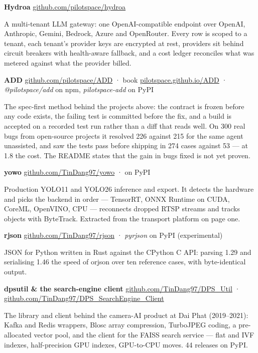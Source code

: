 \documentclass[10pt,a4paper,ragged2e,withhyper]{altacv}
\newcommand{\work}[3]{\par\vspace{7pt}\noindent\textbf{\textcolor{accent}{#1}} \textcolor{accent}{\textbullet} {\footnotesize #2}\par\nobreak\vspace{1pt}\noindent #3\par}
\begin{document}
\work{Hydroa}{\href{https://github.com/pilotspace/hydroa}{github.com/pilotspace/hydroa}}{A multi-tenant LLM gateway: one OpenAI-compatible endpoint over OpenAI, Anthropic, Gemini, Bedrock, Azure and OpenRouter. Every row is scoped to a tenant, each tenant's provider keys are encrypted at rest, providers sit behind circuit breakers with health-aware fallback, and a cost ledger reconciles what was metered against what the provider billed.}

\work{ADD}{\href{https://github.com/pilotspace/ADD}{github.com/pilotspace/ADD} · book \href{https://pilotspace.github.io/ADD/}{pilotspace.github.io/ADD} · \textit{@pilotspace/add} on npm, \textit{pilotspace-add} on PyPI}{The spec-first method behind the projects above: the contract is frozen before any code exists, the failing test is committed before the fix, and a build is accepted on a recorded test run rather than a diff that reads well. On 300 real bugs from open-source projects it resolved 226 against 215 for the same agent unassisted, and saw the tests pass before shipping in 274 cases against 53 --- at 1.8\texttimes{} the cost. The README states that the gain in bugs fixed is not yet proven.}

\work{yowo}{\href{https://github.com/TinDang97/yowo}{github.com/TinDang97/yowo} · on PyPI}{Production YOLO11 and YOLO26 inference and export. It detects the hardware and picks the backend in order --- TensorRT, ONNX Runtime on CUDA, CoreML, OpenVINO, CPU --- reconnects dropped RTSP streams and tracks objects with ByteTrack. Extracted from the transport platform on page one.}

\work{rjson}{\href{https://github.com/TinDang97/rjson}{github.com/TinDang97/rjson} · \textit{pyrjson} on PyPI (experimental)}{JSON for Python written in Rust against the CPython C API: parsing 1.29\texttimes{} and serialising 1.46\texttimes{} the speed of orjson over ten reference cases, with byte-identical output.}

\work{dpsutil \& the search-engine client}{\href{https://github.com/TinDang97/DPS_Util}{github.com/TinDang97/DPS\_Util} · \href{https://github.com/TinDang97/DPS_SearchEngine_Client}{github.com/TinDang97/DPS\_SearchEngine\_Client}}{The library and client behind the camera-AI product at Dai Phat (2019--2021): Kafka and Redis wrappers, Blosc array compression, TurboJPEG coding, a pre-allocated vector pool, and the client for the FAISS search service --- flat and IVF indexes, half-precision GPU indexes, GPU-to-CPU moves. 44 releases on PyPI.}
\end{document}
